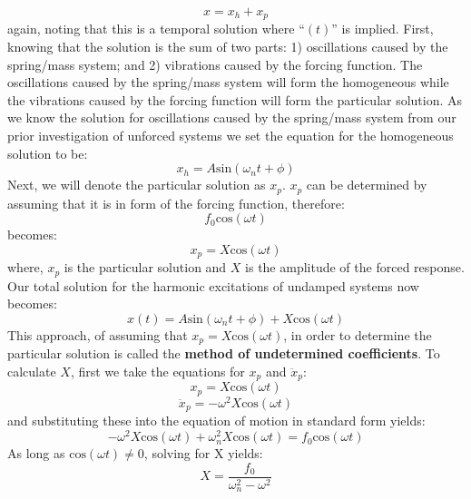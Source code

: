 \documentclass[12pt,letter]{article}
\begin{document}
	\begin{equation}
		x = x_h + x_p
	\end{equation}	
	again, noting that this is a temporal solution where ``$(t)$'' is implied. First, knowing that the solution is the sum of two parts: 1) oscillations caused by the spring/mass system; and 2) vibrations caused by the forcing function. The oscillations caused by the spring/mass system will form the homogeneous while the vibrations caused by the forcing function will form the particular solution. As we know the solution for oscillations caused by the spring/mass system from our prior investigation of unforced systems we set the equation for the homogeneous solution to be:
	\begin{equation}
		x_h = A\text{sin}(\omega_n t + \phi)
	\end{equation}			
	Next, we will denote the particular solution as $x_p$. $x_p$ can be determined by assuming that it is in form of the forcing function, therefore:
	\begin{equation}
		f_0\text{cos}(\omega t)
	\end{equation}	
	becomes:
	\begin{equation}
		x_p  =X\text{cos}(\omega t)
	\end{equation}						
	where, $x_p$ is the particular solution and $X$ is the amplitude of the forced response. Our total solution for the harmonic excitations of undamped systems now becomes:
	\begin{equation}
		x(t) = A\text{sin}(\omega_n t + \phi) + X\text{cos}(\omega t) 
	\end{equation}				
	This approach, of assuming that $x_p=X\text{cos}(\omega t)$, in order to determine the particular solution is called the \textbf{method of undetermined coefficients}. To calculate $X$, first we take the equations for $x_p$ and $\ddot{x}_p $:
	\begin{equation}
		x_p = X\text{cos}(\omega t)
	\end{equation}	
	\begin{equation}
		\ddot{x}_p = -\omega^2X\text{cos}(\omega t)
	\end{equation}				
	and substituting these into the equation of motion in standard form yields:
	\begin{equation}
		-\omega^2X\text{cos}(\omega t)+\omega_n^2X\text{cos}(\omega t) = f_0\text{cos}(\omega t)
	\end{equation}		
	As long as 	$\text{cos}(\omega t) \neq  0$, solving for X yields:
	\begin{equation}
		X = \frac{f_0}{\omega_n^2-\omega^2}
		\label{eq:X}
	\end{equation}		
\end{document}

